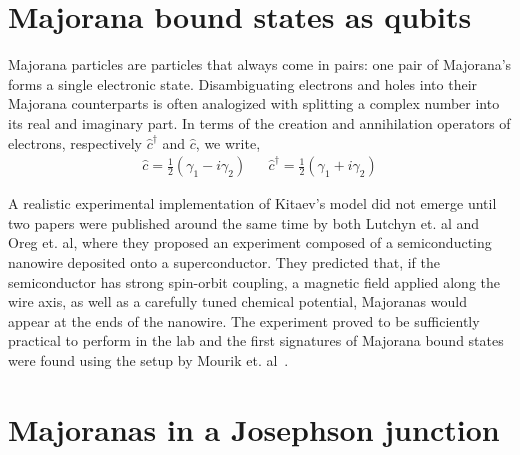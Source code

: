 \section{Majorana bound states as qubits}

	Majorana particles are particles that always come in pairs: one pair of Majorana's forms a single electronic state.
	Disambiguating electrons and holes into their Majorana counterparts is often analogized with splitting a complex number into its real and imaginary part.
	In terms of the creation and annihilation operators of electrons, respectively $\hat{c}^\dagger$ and $\hat{c}$, we write,
	\begin{align}
		\hat{c} =  \frac{1}{2} \left( \gamma_1 - i\gamma_2 \right) && \hat{c}^\dagger = \frac{1}{2} \left( \gamma_1 + i\gamma_2 \right)
	\end{align}

	A realistic experimental implementation of Kitaev's model did not emerge until two papers were published around the same time by both Lutchyn et. al\cite{lutchyn_majorana_2010} and Oreg et. al\cite{ oreg_helical_2010}, where they proposed an experiment composed of a semiconducting nanowire deposited onto a superconductor.
	They predicted that, if the semiconductor has strong spin-orbit coupling, a magnetic field applied along the wire axis, as well as a carefully tuned chemical potential, Majoranas would appear at the ends of the nanowire.
	The experiment proved to be sufficiently practical to perform in the lab and the first signatures of Majorana bound states were found using the setup by Mourik et. al~\cite{mourik_signatures_2012}.




\section{Majoranas in a Josephson junction}




